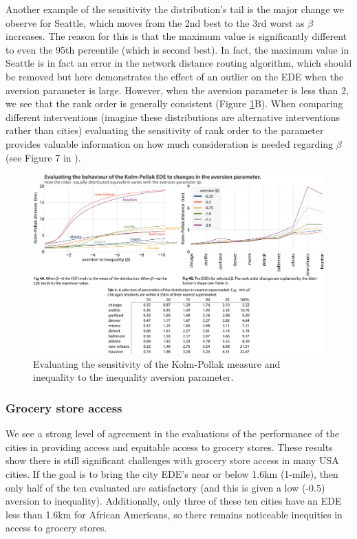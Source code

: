 \documentclass[final,3p,times,onecolumn,sort&compress]{elsarticle}
\begin{document}
Another example of the sensitivity the distribution's tail is the major change we observe for Seattle, which moves from the 2nd best to the 3rd worst as $\beta$ increases.
The reason for this is that the maximum value is significantly different to even the 95th percentile (which is second best).
In fact, the maximum value in Seattle is in fact an error in the network distance routing algorithm, which should be removed but here demonstrates the effect of an outlier on the EDE when the aversion parameter is large.
However, when the aversion parameter is less than 2, we see that the rank order is generally consistent (Figure \ref{fig:aversion}B).
When comparing different interventions (imagine these distributions are alternative interventions rather than cities) evaluating the sensitivity of rank order to the parameter provides valuable information on how much consideration is needed regarding $\beta$ (see Figure 7 in \cite{Atkinson1970-mr}).

\begin{figure}[h!]
    \includegraphics[width=\linewidth]{report/fig/fig3.png}
    \caption{
    Evaluating the sensitivity of the Kolm-Pollak measure and inequality to the inequality aversion parameter.
    }
    \label{fig:aversion}
\end{figure}
\subsubsection{Grocery store access}
We see a strong level of agreement in the evaluations of the performance of the cities in providing access and equitable access to grocery stores.
These results show there is still significant challenges with grocery store access in many USA cities.
If the goal is to bring the city EDE's near or below 1.6km (1-mile), then only half of the ten evaluated are satisfactory (and this is given a low (-0.5) aversion to inequality).
Additionally, only three of these ten cities have an EDE less than 1.6km for African Americans, so there remains noticeable inequities in access to grocery stores.
\end{document}
